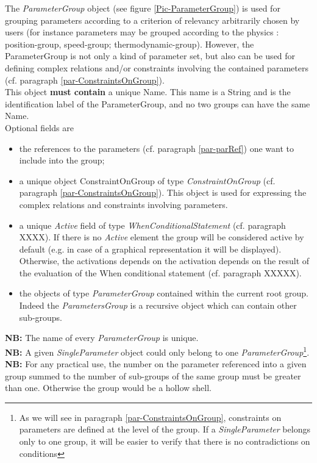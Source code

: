 \documentclass[a4paper,11pt] {ivoa}
\begin{document}
The {\it ParameterGroup} object (see figure \ref{Pic-ParameterGroup}) is used for grouping
parameters according to a criterion of relevancy arbitrarily chosen by users (for instance
parameters may be grouped according to the physics : position-group, speed-group; thermodynamic-group).
However,  the ParameterGroup is not only a kind of parameter set, but also can be used for
defining complex relations and/or constraints involving the contained parameters (cf. paragraph
\ref{par-ConstraintsOnGroup}).\\
This object {\bf must contain} a unique Name. This name is a String and is the identification label
of the ParameterGroup, and no two groups can have the same Name.\\
Optional fields are
\begin{itemize}
\item the references to the parameters (cf. paragraph \ref{par-parRef}) one want to include into the
group;
\item a unique object ConstraintOnGroup of type {\it ConstraintOnGroup} (cf. paragraph 
\ref{par-ConstraintsOnGroup}). This object is used for expressing the complex relations and
constraints involving parameters.
\item a unique {\it Active} field of type {\it WhenConditionalStatement} (cf. paragraph XXXX). If there is no {\it Active} element the group will be considered active by default  (e.g. in case of a graphical representation it will be displayed). Otherwise, the activations depends on the activation depends on the result of the evaluation of the When conditional statement (cf. paragraph XXXXX).

 
\item the objects of type {\it ParameterGroup} contained within the current root group. Indeed the
{\it ParametersGroup} is a recursive object which can contain other sub-groups.
\end{itemize}

{\bf NB:} The name of every {\it ParameterGroup} is unique.\\

{\bf NB:} A given {\it SingleParameter} object could only belong to one {\it
ParameterGroup}\footnote{As we will see in paragraph \ref{par-ConstraintsOnGroup}, constraints on
parameters are defined at the level of the group. If a {\it SingleParameter} belongs only to one
group, it will be easier to verify that there is no contradictions on conditions}.
{\bf NB:}  For any practical use, the number on the parameter referenced into a given group summed
to the number of sub-groups of the same group must be greater than one. Otherwise the group would be
a hollow shell.
\end{document}
